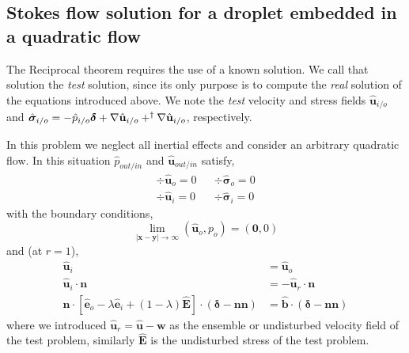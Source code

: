 \subsection{Stokes flow solution for a droplet embedded in a quadratic flow}
The Reciprocal theorem requires the use of a known solution.
We call that solution the \textit{test} solution, since its only purpose is to compute the \textit{real} solution of the equations introduced above. 
We note the \textit{test} velocity and stress fields $\hat{\textbf{u}}_{i/o}$ and $\hat{\bm\sigma}_{i/o} = - \hat{p}_{i/o}\bm\delta + \mathbf{\nabla} \hat{\textbf{u}}_{i/o} + ^\dagger\mathbf{\nabla} \hat{\textbf{u}}_{i/o}$, respectively. 

In this problem we neglect all inertial effects and consider an arbitrary quadratic flow. 
In this situation $\hat{p}_{out/in}$ and $\hat{\textbf{u}}_{out/in}$ satisfy,
\begin{align}
    \div \hat{\textbf{u}}_{o} = 0 
    &&\div\hat{\bm\sigma}_{o}  = 0 
    \label{eq:momentum_out_s}\\
    \div \hat{\textbf{u}}_{i} = 0 
    && \div\hat{\bm\sigma}_{i}  = 0 
    \label{eq:momentum_in_s}
\end{align}
with the boundary conditions, 
\begin{equation}
    \lim_{|\textbf{x}-\textbf{y}|\to \infty}(\hat{\textbf{u}}_{o},p_{o}) = (\textbf{0},0) 
\end{equation}
and (at $r=1$),
\begin{align}
    \hat{\textbf{u}}_{i} &= \hat{\textbf{u}}_{o}\\
    \hat{\textbf{u}}_{i} \cdot \textbf{n} &= - \hat{\textbf{u}}_r \cdot \textbf{n}
    \label{eq:normal_vel_s}
    \\
    \mathbf{n}\cdot [\hat{\textbf{e}}_{o} - \lambda \hat{\textbf{e}}_{i} + (1-\lambda) \hat{\textbf{E}}
    ]\cdot (\bm\delta - \textbf{nn})
    &=
    \hat{\textbf{b}}\cdot (\bm\delta - \textbf{nn})
\end{align}
where we introduced $\hat{\textbf{u}}_r = \hat{\textbf{u}} - \textbf{w}$ as the ensemble or undisturbed velocity field of the test problem, similarly $\hat{\textbf{E}}$ is the undisturbed stress of the test problem. 


